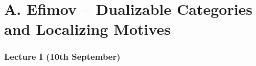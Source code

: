 \part*{A. Efimov -- Dualizable Categories and Localizing Motives}
\section{Lecture I (10th September)}\label{sec: Efimov I}